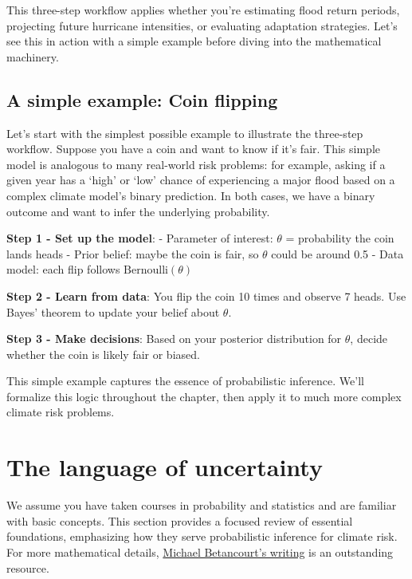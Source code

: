 \documentclass[
  letterpaper,
  DIV=11,
  numbers=noendperiod]{scrreprt}
\begin{document}
This three-step workflow applies whether you're estimating flood return
periods, projecting future hurricane intensities, or evaluating
adaptation strategies. Let's see this in action with a simple example
before diving into the mathematical machinery.

\subsection{A simple example: Coin
flipping}\label{a-simple-example-coin-flipping}

Let's start with the simplest possible example to illustrate the
three-step workflow. Suppose you have a coin and want to know if it's
fair. This simple model is analogous to many real-world risk problems:
for example, asking if a given year has a `high' or `low' chance of
experiencing a major flood based on a complex climate model's binary
prediction. In both cases, we have a binary outcome and want to infer
the underlying probability.

\textbf{Step 1 - Set up the model}: - Parameter of interest: \(\theta\)
= probability the coin lands heads - Prior belief: maybe the coin is
fair, so \(\theta\) could be around 0.5 - Data model: each flip follows
\(\text{Bernoulli}(\theta)\)

\textbf{Step 2 - Learn from data}: You flip the coin 10 times and
observe 7 heads. Use Bayes' theorem to update your belief about
\(\theta\).

\textbf{Step 3 - Make decisions}: Based on your posterior distribution
for \(\theta\), decide whether the coin is likely fair or biased.

This simple example captures the essence of probabilistic inference.
We'll formalize this logic throughout the chapter, then apply it to much
more complex climate risk problems.

\section{The language of uncertainty}\label{the-language-of-uncertainty}

We assume you have taken courses in probability and statistics and are
familiar with basic concepts. This section provides a focused review of
essential foundations, emphasizing how they serve probabilistic
inference for climate risk. For more mathematical details,
\href{https://betanalpha.github.io/writing/}{Michael Betancourt's
writing} is an outstanding resource.
\end{document}
